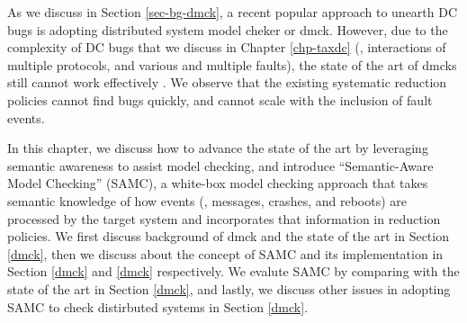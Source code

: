 
As we discuss in Section \ref{sec-bg-dmck}, a recent popular approach to unearth
DC bugs is adopting distributed system model cheker or dmck. However, due to the
complexity of DC bugs that we discuss in Chapter \ref{chp-taxdc} (\eg,
interactions of multiple protocols, and various and multiple faults), the state
of the art of dmcks still cannot work effectively . We observe that the existing systematic reduction policies
cannot find bugs quickly, and cannot scale with the inclusion of fault events.

In this chapter, we discuss how to advance the state of the art by leveraging
semantic awareness to assist model checking, and introduce ``Semantic-Aware
Model Checking'' (SAMC), a white-box model checking approach that takes semantic
knowledge of how events (\eg, messages, crashes, and reboots) are processed by
the target system and incorporates that information in reduction policies. We
first discuss background of dmck and the state of the art in Section \ref{dmck},
then we discuss about the concept of SAMC and its implementation in Section
\ref{dmck} and \ref{dmck} respectively. We evalute SAMC by comparing with the
state of the art in Section \ref{dmck}, and lastly, we discuss other issues in
adopting SAMC to check distirbuted systems in Section \ref{dmck}.


